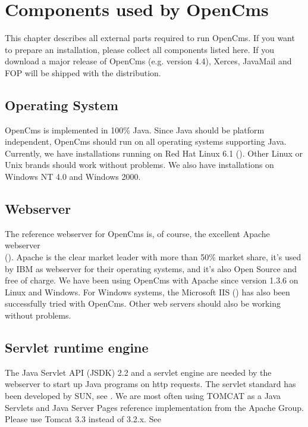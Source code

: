 \chapter{Components used by OpenCms}
\label{components}

This chapter describes all external parts required to run OpenCms.
If you want to prepare an installation, please collect all
components listed here. If you download a major release of OpenCms
(e.g. version 4.4), Xerces, JavaMail and FOP will be shipped with
the distribution.

\section{Operating System}
OpenCms is implemented in 100\% Java. Since Java should be platform independent, OpenCms should run
on all operating systems supporting Java. Currently, we have installations running on
Red Hat Linux 6.1 (). Other
Linux or Unix brands should work without problems. We also have installations on
Windows NT 4.0 and Windows 2000.

\section{Webserver}
The reference webserver for OpenCms is, of course, the excellent Apache webserver \\
().
Apache is the clear market leader with more than 50\% market share,
it's used by IBM as webserver for their operating systems, and it's also Open Source and
free of charge. We have been using OpenCms with Apache since version 1.3.6 on Linux and Windows.
For Windows systems, the Microsoft IIS ()
has also been successfully tried with OpenCms. Other web servers should also be working without problems.

\section{Servlet runtime engine}
The Java Servlet API (JSDK) 2.2 and a servlet engine are needed by
the webserver to start up Java programs on http requests. The
servlet standard has been developed by SUN, see
.
We are most often using TOMCAT as a Java Servlets and Java Server
Pages reference implementation from the Apache Group. Please use
Tomcat 3.3 instead of 3.2.x. See

